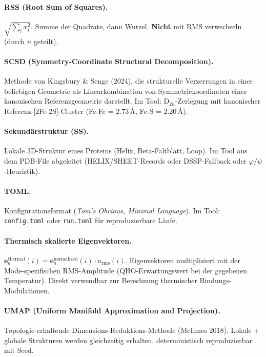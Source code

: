 \documentclass[11pt,a4paper,twoside]{article}
\providecommand{\angstrom}{\text{\AA}}    %
\theoremstyle{remark}
\begin{document}
\paragraph{RSS (Root Sum of Squares).}
$\sqrt{\sum_i x_i^2}$. Summe der Quadrate, dann Wurzel.
\textbf{Nicht} mit RMS verwechseln (durch $n$ geteilt).

\paragraph{SCSD (Symmetry-Coordinate Structural Decomposition).}
Methode von Kingsbury \& Senge (2024), die strukturelle
Verzerrungen in einer beliebigen Geometrie als Linearkombination
von Symmetriekoordinaten einer kanonischen Referenzgeometrie
darstellt. Im Tool: D$_{2h}$-Zerlegung mit kanonischer
Referenz-[2Fe-2S]-Cluster (Fe-Fe = 2.73\,$\angstrom$,
Fe-S = 2.20\,$\angstrom$).

\paragraph{Sekund\"arstruktur (SS).}
Lokale 3D-Struktur eines Proteins (Helix, Beta-Faltblatt, Loop).
Im Tool aus dem PDB-File abgeleitet (HELIX/SHEET-Records oder
DSSP-Fallback oder $\varphi/\psi$-Heuristik).

\paragraph{TOML.}
Konfigurationsformat (\emph{Tom's Obvious, Minimal Language}).
Im Tool: \texttt{config.toml} oder \texttt{run.toml} f\"ur
reproduzierbare L\"aufe.

\paragraph{Thermisch skalierte Eigenvektoren.}
$\mathbf{e}_a^\text{thermal}(i) = \mathbf{e}_a^\text{normalized}(i)
\cdot u_\text{rms}(i)$. Eigenvektoren multipliziert mit der
Mode-spezifischen RMS-Amplitude (QHO-Erwartungswert bei der
gegebenen Temperatur). Direkt verwendbar zur Berechnung
thermischer Bindungs-Modulationen.

\paragraph{UMAP (Uniform Manifold Approximation and Projection).}
Topologie-erhaltende Dimensions-Reduktions-Methode (McInnes 2018).
Lokale + globale Strukturen werden gleichzeitig erhalten,
deterministisch reproduzierbar mit Seed.
\end{document}
